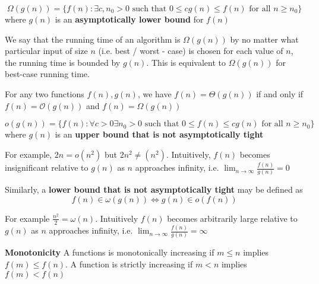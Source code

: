 \documentclass[11pt]{article}
\begin{document}
\begin{defn*}
  \[
    \Omega(g(n)) = \{ f(n): \exists c, n_0 > 0 \text{ such that } 0 \leq cg(n)\leq f(n)  \text{ for all } n\geq n_0\}
  \]
  where $g(n)$ is an \textbf{asymptotically lower bound} for $f(n)$
  \begin{rem}
    We say that the running time of an algorithm is $\Omega(g(n))$ by no matter what particular input of size $n$ (i.e. best / worst - case) is chosen for each value of $n$, the running time is bounded by $g(n)$. This is equivalent to $\Omega(g(n))$ for best-case running time.
  \end{rem}
\end{defn*}

\begin{theorem*}
  For any two functions $f(n), g(n)$, we have $f(n) = \Theta(g(n))$ if and only if $f(n) = \mathcal{O}(g(n))$ and $f(n) = \Omega(g(n))$
\end{theorem*}


\begin{defn*}
  \[
    o(g(n)) = \{ f(n): \forall c > 0 \exists n_0 > 0 \text{ such that } 0\leq f(n) \leq cg(n) \text{ for all } n\geq n_0\}
  \]
  where $g(n)$ is an \textbf{upper bound that is not asymptotically tight}
  \begin{rem}
    For example, $2n = o(n^2)$ but $2n^2 \neq(n^2)$. Intuitively, $f(n)$ becomes insignificant relative to $g(n)$ as $n$ approaches infinity, i.e. $\lim_{n\to \infty} \frac{f(n)}{g(n)} = 0$
  \end{rem}
\end{defn*}



\begin{defn*}
  Similarly, a \textbf{lower bound that is not asymptotically tight} may be defined as
  \[
    f(n) \in \omega(g(n)) \iff g(n) \in o(f(n))
  \]
  \begin{rem}
    For example $\frac{n^2}{2} = \omega(n)$. Intuitively $f(n)$ becomes arbitrarily large relative to $g(n)$ as $n$ approaches infinity, i.e. $\lim_{n\to \infty} \frac{f(n)}{g(n)} = \infty$
  \end{rem}
\end{defn*}

\begin{defn*}
  \textbf{Monotonicity} A functions is monotonically increasing if $m\leq n$ implies $f(m)\leq f(n)$. A function is strictly increasing if $m<n$ implies $f(m) < f(n)$
\end{defn*}
\end{document}
